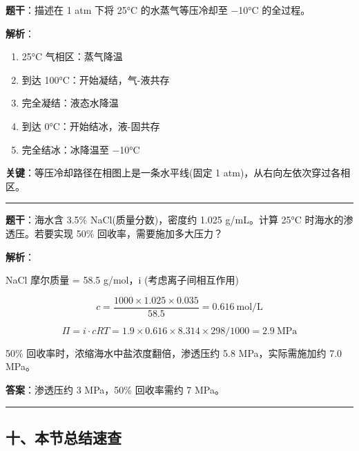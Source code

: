 \textbf{题干}：描述在 1 atm 下将 25°C 的水蒸气等压冷却至 −10°C 的全过程。

\textbf{解析}：

\begin{enumerate}
\def\labelenumi{\arabic{enumi}.}
\tightlist
\item
  25°C 气相区：蒸气降温
\item
  到达 100°C：开始凝结，气-液共存
\item
  完全凝结：液态水降温
\item
  到达 0°C：开始结冰，液-固共存
\item
  完全结冰：冰降温至 −10°C
\end{enumerate}

\textbf{关键}：等压冷却路径在相图上是一条水平线(固定 1 atm)，从右向左依次穿过各相区。

\begin{center}\rule{0.5\linewidth}{0.5pt}\end{center}

\textbf{题干}：海水含 3.5\% NaCl(质量分数)，密度约 1.025 g/mL。计算 25°C 时海水的渗透压。若要实现 50\% 回收率，需要施加多大压力？

\textbf{解析}：

NaCl 摩尔质量 = 58.5 g/mol，i (考虑离子间相互作用)

\[c = \frac{1000 \times 1.025 \times 0.035}{58.5} = 0.616\ \mathrm{mol/L}\]

\[\Pi = i \cdot cRT = 1.9 \times 0.616 \times 8.314 \times 298 / 1000 = 2.9\ \mathrm{MPa}\]

50\% 回收率时，浓缩海水中盐浓度翻倍，渗透压约 5.8 MPa，实际需施加约 7.0 MPa。

\textbf{答案}：渗透压约 3 MPa，50\% 回收率需约 7 MPa。

\begin{center}\rule{0.5\linewidth}{0.5pt}\end{center}

\subsection{十、本节总结速查}\label{ux5341ux672cux8282ux603bux7ed3ux901fux67e5}

